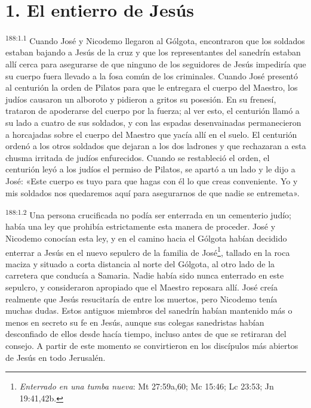 \section*{1. El entierro de Jesús}
\par 
\textsuperscript{188:1.1} Cuando José y Nicodemo llegaron al Gólgota, encontraron que los soldados estaban bajando a Jesús de la cruz y que los representantes del sanedrín estaban allí cerca para asegurarse de que ninguno de los seguidores de Jesús impediría que su cuerpo fuera llevado a la fosa común de los criminales. Cuando José presentó al centurión la orden de Pilatos para que le entregara el cuerpo del Maestro, los judíos causaron un alboroto y pidieron a gritos su posesión. En su frenesí, trataron de apoderarse del cuerpo por la fuerza; al ver esto, el centurión llamó a su lado a cuatro de sus soldados, y con las espadas desenvainadas permanecieron a horcajadas sobre el cuerpo del Maestro que yacía allí en el suelo. El centurión ordenó a los otros soldados que dejaran a los dos ladrones y que rechazaran a esta chusma irritada de judíos enfurecidos. Cuando se restableció el orden, el centurión leyó a los judíos el permiso de Pilatos, se apartó a un lado y le dijo a José: «Este cuerpo es tuyo para que hagas con él lo que creas conveniente. Yo y mis soldados nos quedaremos aquí para asegurarnos de que nadie se entremeta».

\par 
\textsuperscript{188:1.2} Una persona crucificada no podía ser enterrada en un cementerio judío; había una ley que prohibía estrictamente esta manera de proceder. José y Nicodemo conocían esta ley, y en el camino hacia el Gólgota habían decidido enterrar a Jesús en el nuevo sepulcro de la familia de José\footnote{\textit{Enterrado en una tumba nueva}: Mt 27:59a,60; Mc 15:46; Lc 23:53; Jn 19:41,42b.}, tallado en la roca maciza y situado a corta distancia al norte del Gólgota, al otro lado de la carretera que conducía a Samaria. Nadie había sido nunca enterrado en este sepulcro, y consideraron apropiado que el Maestro reposara allí. José creía realmente que Jesús resucitaría de entre los muertos, pero Nicodemo tenía muchas dudas. Estos antiguos miembros del sanedrín habían mantenido más o menos en secreto su fe en Jesús, aunque sus colegas sanedristas habían desconfiado de ellos desde hacía tiempo, incluso antes de que se retiraran del consejo. A partir de este momento se convirtieron en los discípulos más abiertos de Jesús en todo Jerusalén.

